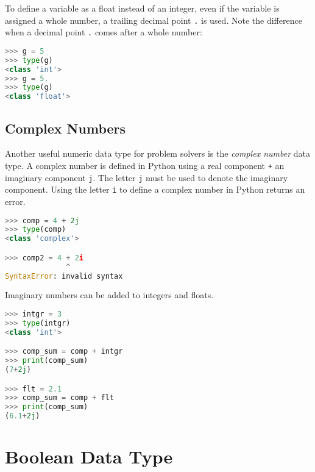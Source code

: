 \documentclass{book}
\newcommand{\passthrough}[1]{#1}
\begin{document}
To define a variable as a float instead of an integer, even if the
variable is assigned a whole number, a trailing decimal point
\passthrough{\lstinline!.!} is used. Note the difference when a decimal
point \passthrough{\lstinline!.!} comes after a whole number:

\begin{lstlisting}[language=Python]
>>> g = 5
>>> type(g)
<class 'int'>
>>> g = 5.
>>> type(g)
<class 'float'>
\end{lstlisting}
    




    
        \hypertarget{complex-numbers}{%
\subsection{Complex Numbers}\label{complex-numbers}}

Another useful numeric data type for problem solvers is the
\emph{complex number} data type. A complex number is defined in Python
using a real component \passthrough{\lstinline!+!} an imaginary
component \passthrough{\lstinline!j!}. The letter
\passthrough{\lstinline!j!} must be used to denote the imaginary
component. Using the letter \passthrough{\lstinline!i!} to define a
complex number in Python returns an error.

\begin{lstlisting}[language=Python]
>>> comp = 4 + 2j
>>> type(comp)
<class 'complex'>

>>> comp2 = 4 + 2i
              ^
SyntaxError: invalid syntax
\end{lstlisting}

Imaginary numbers can be added to integers and floats.

\begin{lstlisting}[language=Python]
>>> intgr = 3
>>> type(intgr)
<class 'int'>

>>> comp_sum = comp + intgr
>>> print(comp_sum)
(7+2j)

>>> flt = 2.1
>>> comp_sum = comp + flt
>>> print(comp_sum)
(6.1+2j)
\end{lstlisting}
    




    
        \hypertarget{boolean-data-type}{%
\section{Boolean Data Type}\label{boolean-data-type}}
    
\end{document}
